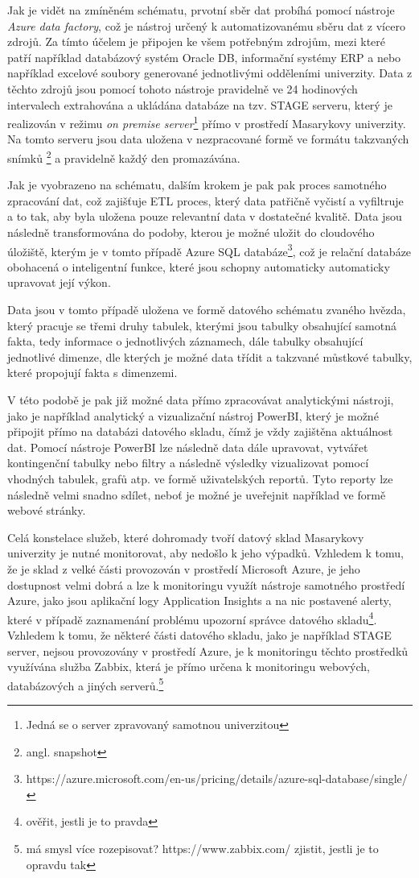 \documentclass[
  digital,     %
  twoside,     %
  lof,         %
  lot,         %
]{fithesis4}
\begin{document}
Jak je vidět na zmíněném schématu, prvotní sběr dat probíhá pomocí nástroje \emph{Azure data factory}, což je nástroj určený k automatizovanému sběru dat z vícero zdrojů. Za tímto účelem je připojen ke všem potřebným zdrojům, mezi které patří například databázový systém Oracle DB, informační systémy ERP a nebo například excelové soubory generované jednotlivými odděleními univerzity. Data z těchto zdrojů jsou pomocí tohoto nástroje pravidelně ve 24 hodinových intervalech extrahována a ukládána databáze na tzv. STAGE serveru, který je realizován v režimu \emph{on premise server}\footnote{Jedná se o server zpravovaný samotnou univerzitou} přímo v prostředí Masarykovy univerzity. Na tomto serveru jsou data uložena v nezpracované formě ve formátu takzvaných snímků \footnote{angl. snapshot} a pravidelně každý den promazávána.

Jak je vyobrazeno na schématu, dalším krokem je pak pak proces samotného zpracování dat, což zajišťuje ETL proces, který data patřičně vyčistí a vyfiltruje a to tak, aby byla uložena pouze relevantní data v dostatečné kvalitě. Data jsou následně transformována do podoby, kterou je možné uložit do cloudového úložiště, kterým je v tomto případě Azure SQL databáze\footnote{https://azure.microsoft.com/en-us/pricing/details/azure-sql-database/single/}, což je relační databáze obohacená o inteligentní funkce, které jsou schopny automaticky automaticky upravovat její výkon.

Data jsou v tomto případě uložena ve formě datového schématu zvaného hvězda, který pracuje se třemi druhy tabulek, kterými jsou tabulky obsahující samotná fakta, tedy informace o jednotlivých záznamech, dále tabulky obsahující jednotlivé dimenze, dle kterých je možné data třídit a takzvané můstkové tabulky, které propojují fakta s dimenzemi. 

V této podobě je pak již možné data přímo zpracovávat analytickými nástroji, jako je například analytický a vizualizační nástroj PowerBI, který je možné připojit přímo na databázi datového skladu, čímž je vždy zajištěna aktuálnost dat. Pomocí nástroje PowerBI lze následně data dále upravovat, vytvářet kontingenční tabulky nebo filtry a následně výsledky vizualizovat pomocí vhodných tabulek, grafů atp. ve formě uživatelských reportů. Tyto reporty lze následně velmi snadno sdílet, neboť je možné je uveřejnit například ve formě webové stránky.

Celá konstelace služeb, které dohromady tvoří datový sklad Masarykovy univerzity je nutné monitorovat, aby nedošlo k jeho výpadků. Vzhledem k tomu, že je sklad z velké části provozován v prostředí Microsoft Azure, je jeho dostupnost velmi dobrá a lze k monitoringu využít nástroje samotného prostředí Azure, jako jsou aplikační logy Application Insights a na nic postavené alerty, které v případě zaznamenání problému upozorní správce datového skladu\footnote{ověřit, jestli je to pravda}. Vzhledem k tomu, že některé části datového skladu, jako je například STAGE server, nejsou provozovány v prostředí Azure, je k monitoringu těchto prostředků využívána služba Zabbix, která je přímo určena k monitoringu webových, databázových a jiných serverů.\footnote{má smysl více rozepisovat? https://www.zabbix.com/ zjistit, jestli je to opravdu tak}
\end{document}
